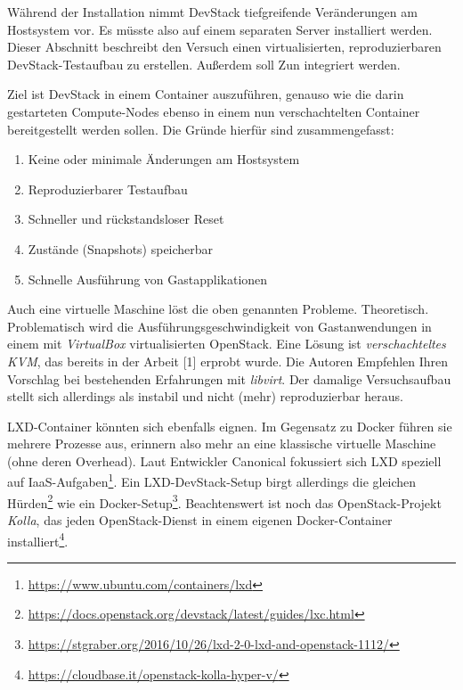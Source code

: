 Während der Installation nimmt DevStack tiefgreifende Veränderungen am Hostsystem vor. Es müsste also auf einem separaten Server installiert werden. Dieser Abschnitt beschreibt den Versuch einen virtualisierten, reproduzierbaren DevStack-Testaufbau zu erstellen. Außerdem soll Zun integriert werden. 

Ziel ist DevStack in einem Container auszuführen, genauso wie die darin gestarteten Compute-Nodes ebenso in einem nun verschachtelten Container bereitgestellt werden sollen. Die Gründe hierfür sind zusammengefasst:

\begin{enumerate}
	\item Keine oder minimale Änderungen am Hostsystem
	\item Reproduzierbarer Testaufbau
	\item Schneller und rückstandsloser Reset
	\item Zustände (Snapshots) speicherbar
	\item Schnelle Ausführung von Gastapplikationen
\end{enumerate}

\noindent Auch eine virtuelle Maschine löst die oben genannten Probleme. Theoretisch. Problematisch wird die Ausführungsgeschwindigkeit von Gastanwendungen in einem mit \emph{VirtualBox} virtualisierten OpenStack. Eine Lösung ist \emph{verschachteltes KVM}, das bereits in der Arbeit [1] erprobt wurde. Die Autoren Empfehlen Ihren Vorschlag bei bestehenden Erfahrungen mit \emph{libvirt}. Der damalige Versuchsaufbau stellt sich allerdings als instabil und nicht (mehr) reproduzierbar heraus. %


LXD-Container könnten sich ebenfalls eignen. Im Gegensatz zu Docker führen sie mehrere Prozesse aus, erinnern also mehr an eine klassische virtuelle Maschine (ohne deren Overhead). Laut Entwickler Canonical fokussiert sich LXD speziell auf IaaS-Aufgaben\footnote{\url{https://www.ubuntu.com/containers/lxd}}. Ein LXD-DevStack-Setup birgt allerdings die gleichen Hürden\footnote{\url{https://docs.openstack.org/devstack/latest/guides/lxc.html}} wie ein Docker-Setup\footnote{\url{https://stgraber.org/2016/10/26/lxd-2-0-lxd-and-openstack-1112/}}. Beachtenswert ist noch das OpenStack-Projekt \emph{Kolla}, das jeden OpenStack-Dienst in einem eigenen Docker-Container installiert\footnote{\url{https://cloudbase.it/openstack-kolla-hyper-v/}}.

